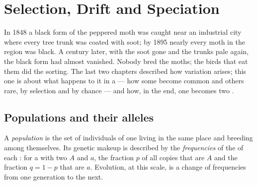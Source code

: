 \chapter{Selection, Drift and Speciation}\label{ch:g12:selection-drift-speciation}

In 1848 a black form of the peppered moth was caught near an industrial
city where every tree trunk was coated with soot; by 1895 nearly every
moth in the region was black. A century later, with the soot gone and
the trunks pale again, the black form had almost vanished. Nobody bred
the moths; the birds that eat them did the sorting. The last two
chapters described how variation arises; this one is about what happens
to it in a  --- how some  become common and others
rare, by selection and by chance --- and how, in the end, one 
becomes two .

\section{Populations and their alleles}

\begin{definition}\label{def:g12:selection-drift-speciation:population}
A \emph{population} is the set of individuals of one
 living in the same place and breeding among themselves. Its
genetic makeup is described by the \emph{frequencies}
of the  of each : for a  with two 
$A$ and $a$, the fraction $p$ of all copies that are $A$ and the
fraction $q = 1 - p$ that are $a$. Evolution, at this scale, is a
change of  frequencies from one generation to the next.
\end{definition}

